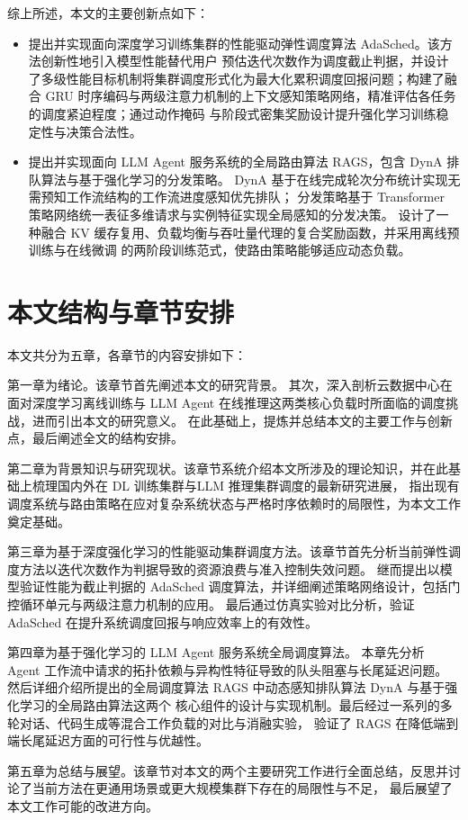 综上所述，本文的主要创新点如下：
\begin{itemize}
    \item 提出并实现面向深度学习训练集群的性能驱动弹性调度算法 AdaSched。该方法创新性地引入模型性能替代用户
          预估迭代次数作为调度截止判据，并设计了多级性能目标机制将集群调度形式化为最大化累积调度回报问题；构建了融合
          GRU 时序编码与两级注意力机制的上下文感知策略网络，精准评估各任务的调度紧迫程度；通过动作掩码
          与阶段式密集奖励设计提升强化学习训练稳定性与决策合法性。
    \item 提出并实现面向 LLM Agent 服务系统的全局路由算法 RAGS，包含 DynA 排队算法与基于强化学习的分发策略。
          DynA 基于在线完成轮次分布统计实现无需预知工作流结构的工作流进度感知优先排队；
          分发策略基于 Transformer 策略网络统一表征多维请求与实例特征实现全局感知的分发决策。
          设计了一种融合 KV 缓存复用、负载均衡与吞吐量代理的复合奖励函数，并采用离线预训练与在线微调
          的两阶段训练范式，使路由策略能够适应动态负载。
\end{itemize}

\section{本文结构与章节安排}

本文共分为五章，各章节的内容安排如下：

第一章为绪论。该章节首先阐述本文的研究背景。
其次，深入剖析云数据中心在面对深度学习离线训练与 LLM Agent 在线推理这两类核心负载时所面临的调度挑战，进而引出本文的研究意义。
在此基础上，提炼并总结本文的主要工作与创新点，最后阐述全文的结构安排。  

第二章为背景知识与研究现状。该章节系统介绍本文所涉及的理论知识，并在此基础上梳理国内外在 DL 训练集群与LLM 推理集群调度的最新研究进展，
指出现有调度系统与路由策略在应对复杂系统状态与严格时序依赖时的局限性，为本文工作奠定基础。

第三章为基于深度强化学习的性能驱动集群调度方法。该章节首先分析当前弹性调度方法以迭代次数作为判据导致的资源浪费与准入控制失效问题。
继而提出以模型验证性能为截止判据的 AdaSched 调度算法，并详细阐述策略网络设计，包括门控循环单元与两级注意力机制的应用。
最后通过仿真实验对比分析，验证 AdaSched 在提升系统调度回报与响应效率上的有效性。

第四章为基于强化学习的 LLM Agent 服务系统全局调度算法。
本章先分析 Agent 工作流中请求的拓扑依赖与异构性特征导致的队头阻塞与长尾延迟问题。
然后详细介绍所提出的全局调度算法 RAGS 中动态感知排队算法 DynA 与基于强化学习的全局路由算法这两个
核心组件的设计与实现机制。最后经过一系列的多轮对话、代码生成等混合工作负载的对比与消融实验，
验证了 RAGS 在降低端到端长尾延迟方面的可行性与优越性。

第五章为总结与展望。该章节对本文的两个主要研究工作进行全面总结，反思并讨论了当前方法在更通用场景或更大规模集群下存在的局限性与不足，
最后展望了本文工作可能的改进方向。

\cleardoublepage
